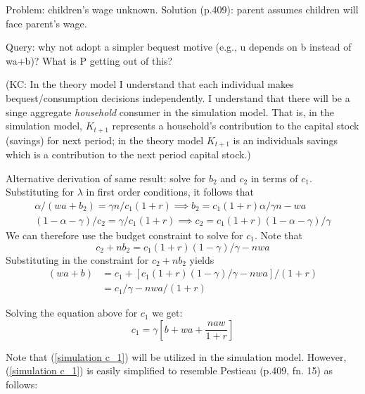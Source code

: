 \documentclass{article}
\begin{document}
Problem: children's wage unknown.
Solution (p.409): parent assumes children will face parent's wage.

Query:
why not adopt a simpler bequest motive (e.g., u depends on b instead of wa+b)?
What is P getting out of this?

(KC: In the theory model I understand that each individual makes bequest/consumption decisions independently.  I understand that there will be a singe aggregate \emph{household} consumer in the simulation model.  That is, in the simulation model, $K_{t+1}$ represents a household's contribution to the capital stock (savings) for next period; in the theory model $K_{t+1}$ is an individuals savings which is a contribution to the next period capital stock.)\newline



Alternative derivation of same result: solve for $b_{2}$ and $c_{2}$ in terms of $c_{1}$.\\
Substituting for $\lambda$ in first order conditions, it follows that
\begin{gather}
\alpha/(wa+b_{2}) = \gamma n/ c_{1} (1+r) \implies b_{2} = c_{1} (1+r) \alpha /\gamma n - wa
\\
(1-\alpha-\gamma)/ c_{2} = \gamma / c_{1} (1+r)  \implies  c_{2} = c_{1}(1+r) (1-\alpha-\gamma)/\gamma
\end{gather}
We can therefore use the budget constraint to solve for $c_{1}$.
Note that
\begin{equation}
c_{2} + n b_{2} = c_{1}(1+r)(1-\gamma)/\gamma - nwa
\end{equation}
Substituting in the constraint for $c_{2} + n b_{2}$ yields
\begin{equation}
\begin{split}
(w a + b)
&= c_{1} + [c_{1}(1+r)(1-\gamma)/\gamma - nwa]/(1+r)
\\
&= c_{1}/\gamma - nwa/(1+r)
\end{split}
\end{equation}

Solving the equation above for $c_{1}$ we get:
\begin{equation}\label{simulation c_1}
c_{1} = \gamma[b + wa + \frac{naw}{1+r}]
\end{equation}

Note that (\ref{simulation c_1}) will be utilized in the simulation model.  However, (\ref{simulation c_1}) is easily simplified to resemble Pestieau (p.409, fn. 15) as follows:
\end{document}
